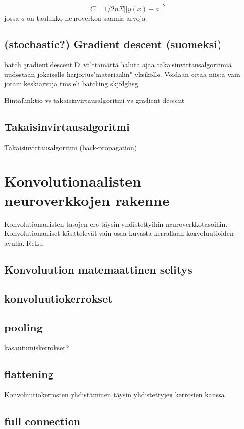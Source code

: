 \documentclass[finnish]{tktltiki2}
\theoremstyle{definition}
\theoremstyle{remark}
\begin{document}
    \begin{equation}
      \label{eq:cost-function}
      C = 1/2n \Sigma || y(x) - a ||^2
    \end{equation}
    jossa $a$ on taulukko neuroverkon saamia arvoja.

  \subsection{(stochastic?) Gradient descent (suomeksi)}
  batch gradient descent
  Ei välttämättä haluta ajaa takaisinvirtausalgoritmiä uudestaan jokaiselle harjoitus"materiaalin" yksikölle. Voidaan ottaa niistä vain jotain keskiarvoja tms eli batching skjfdghsg


  Hintafunktio vs takaisinvirtausalgoritmi vs gradient descent

  \subsection{Takaisinvirtausalgoritmi}
  Takaisinvirtausalgoritmi (back-propagation)

  \section{Konvolutionaalisten neuroverkkojen rakenne}
  Konvolutionaalisten tasojen ero täysin yhdistettyihin neuroverkkotasoihin. Konvolutionaaliset käsittelevät vain osaa kuvasta kerrallaan konvoluutioiden avulla.
  ReLu
  \subsection{Konvoluution matemaattinen selitys}
  \subsection{konvoluutiokerrokset}
  \subsection{pooling}
  kasautumiskerrokset?
  \subsection{flattening}
  Konvoluutiokerrosten yhdistäminen täysin yhdistettyjen kerrosten kanssa
  \subsection{full connection}
\end{document}
